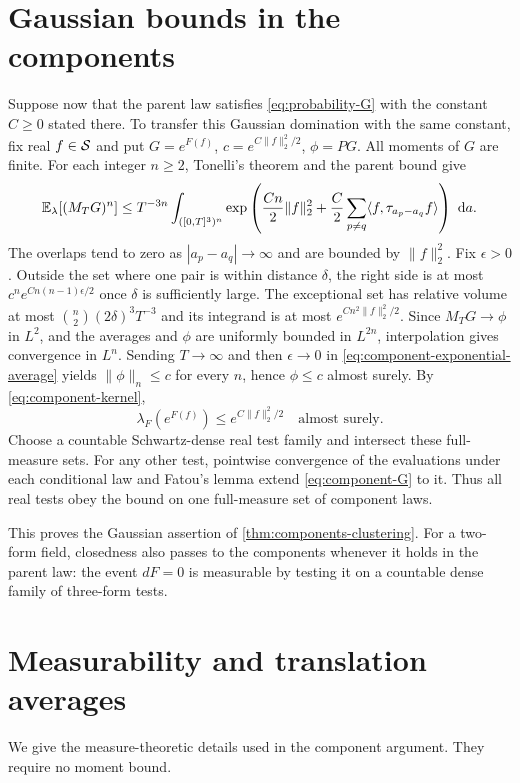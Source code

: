 \section{Gaussian bounds in the components}\label{sec:component-gaussian}
Suppose now that the parent law satisfies
\eqref{eq:probability-G} with the constant $C\ge0$ stated there. To transfer this Gaussian domination with
the same constant, fix real
$f\in\mathcal S$ and put $G=e^{F(f)}$, $c=e^{C\|f\|_2^2/2}$,
$\phi=PG$. All moments of $G$ are finite. For each integer $n\ge2$,
Tonelli's theorem and the parent bound give
\begin{equation}\label{eq:component-exponential-average}
 \mathbb E_\lambda[(M_TG)^n]\le T^{-3n}
 \int_{([0,T]^3)^n}
 \exp\left(\frac {Cn}2\|f\|_2^2+
       \frac C2\sum_{p\ne q}\langle f,\tau_{a_p-a_q}f\rangle\right)\,\,\mathrm d a.
\end{equation}
The overlaps tend to zero as $|a_p-a_q|\to\infty$ and are bounded
by $\|f\|_2^2$. Fix $\epsilon>0$. Outside the set where one pair is within distance
$\delta$, the right side is at most
$c^n e^{Cn(n-1)\epsilon/2}$ once $\delta$ is sufficiently large.
The exceptional set has relative volume at most
$\binom n2(2\delta)^3T^{-3}$ and its integrand is at most
$e^{Cn^2\|f\|_2^2/2}$.
Since $M_TG\to\phi$ in $L^2$, and the averages and $\phi$ are
uniformly bounded in $L^{2n}$, interpolation gives convergence in
$L^n$. Sending $T\to\infty$ and then $\epsilon\to0$ in
\eqref{eq:component-exponential-average} yields
$\|\phi\|_n\le c$ for every $n$, hence $\phi\le c$ almost surely.
By \eqref{eq:component-kernel},
\begin{equation}\label{eq:component-G}
 \lambda_F(e^{F(f)})\le e^{C\|f\|_2^2/2}\quad\text{almost surely}.
\end{equation}
Choose a countable Schwartz-dense real test family and intersect
these full-measure sets. For any other test, pointwise convergence
of the evaluations under each conditional law and Fatou's lemma
extend \eqref{eq:component-G} to it. Thus all real tests obey the
bound on one full-measure set of component laws.

This proves the Gaussian assertion of
\cref{thm:components-clustering}. For a two-form field, closedness
also passes to the components whenever it holds in the parent law:
the event $dF=0$ is measurable by testing it on a countable dense
family of three-form tests.
\appendix
\section{Measurability and translation averages}\label{sec:background}
We give the measure-theoretic details used in the component argument.
They require no moment bound.

